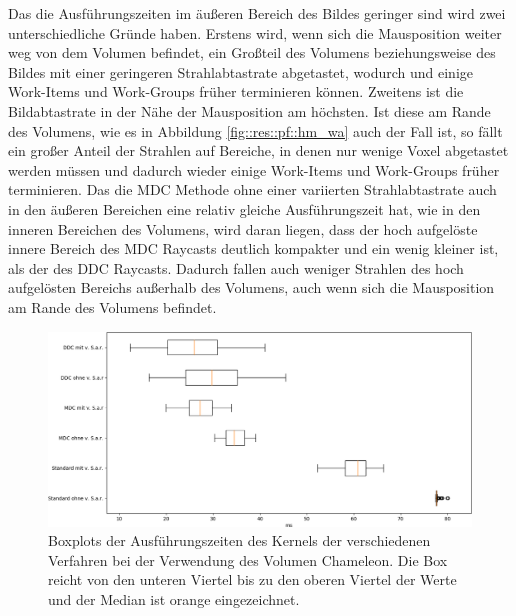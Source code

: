 Das die Ausführungszeiten im äußeren Bereich des Bildes geringer sind wird zwei unterschiedliche Gründe haben.
Erstens wird, wenn sich die Mausposition weiter weg von dem Volumen befindet, ein Großteil des Volumens beziehungsweise des Bildes mit einer geringeren Strahlabtastrate abgetastet, wodurch und einige Work-Items und Work-Groups früher terminieren können.
Zweitens ist die Bildabtastrate in der Nähe der Mausposition am höchsten.
Ist diese am Rande des Volumens, wie es in Abbildung \ref{fig::res::pf::hm_wa} auch der Fall ist, so fällt ein großer Anteil der Strahlen auf Bereiche, in denen nur wenige Voxel abgetastet werden müssen und dadurch wieder einige Work-Items und Work-Groups früher terminieren.
Das die MDC Methode ohne einer variierten Strahlabtastrate auch in den äußeren Bereichen eine relativ gleiche Ausführungszeit hat, wie in den inneren Bereichen des Volumens, wird daran liegen, dass der hoch aufgelöste innere Bereich des MDC Raycasts deutlich kompakter und ein wenig kleiner ist, als der des DDC Raycasts.
Dadurch fallen auch weniger Strahlen des hoch aufgelösten Bereichs außerhalb des Volumens, auch wenn sich die Mausposition am Rande des Volumens befindet.

\begin{figure}
	\centering
	\includegraphics[width=1\textwidth]{../../Neue_Messungen/Chameleon/boxplots.png}
	\caption{Boxplots der Ausführungszeiten des Kernels der verschiedenen Verfahren bei der Verwendung des Volumen Chameleon. Die Box reicht von den unteren Viertel bis zu den oberen Viertel der Werte und der Median ist orange eingezeichnet.}
	\label{fig::res::pf::bp}
\end{figure}

